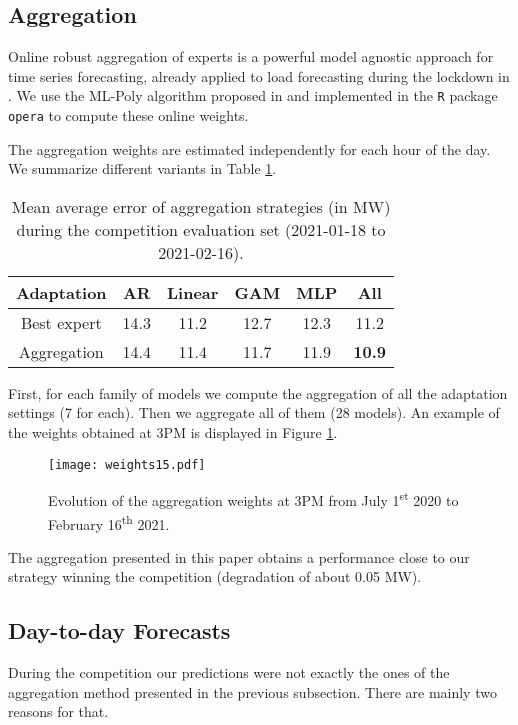 \documentclass[transmag]{IEEEtran}
\begin{document}
\subsection{Aggregation}
Online robust aggregation of experts \cite{Cesa-Bianchi:2006} is a powerful model agnostic approach for time series forecasting, already applied to load forecasting during the lockdown in \cite{obst2021adaptive}.
We use the ML-Poly algorithm proposed in \cite{gaillard2014second} and implemented in the \texttt{R} package \texttt{opera} \cite{gaillard2016opera} to compute these online weights.

The aggregation weights are estimated independently for each hour of the day. We summarize different variants in Table \ref{tab:aggregation}.
\begin{table}[]
    \centering
    \caption{Mean average error of aggregation strategies (in MW) during the competition evaluation set (2021-01-18 to 2021-02-16).}
    \label{tab:aggregation}
    \begin{tabular}{|c|c|c|c|c|c|}
        \hline
        Adaptation & AR & Linear & GAM & MLP & All \\
        \hline
        Best expert & 14.3 & 11.2 & 12.7 & 12.3 & 11.2 \\
        \hline
        Aggregation & 14.4 & 11.4 & 11.7 & 11.9 & {\bf 10.9} \\
        \hline
    \end{tabular}
\end{table}
First, for each family of models we compute the aggregation of all the adaptation settings (7 for each). Then we aggregate all of them (28 models). An example of the weights obtained at 3PM is displayed in Figure \ref{fig:weights}.
\begin{figure}
    \centering
    \texttt{[image: weights15.pdf]}
    \caption{Evolution of the aggregation weights at 3PM from July 1\textsuperscript{st} 2020 to February 16\textsuperscript{th} 2021.}
    \label{fig:weights}
\end{figure}
The aggregation presented in this paper obtains a performance close to our strategy winning the competition (degradation of about 0.05 MW).

\subsection{Day-to-day Forecasts}\label{sec:daybyday}
During the competition our predictions were not exactly the ones of the aggregation method presented in the previous subsection. There are mainly two reasons for that. 
\end{document}
